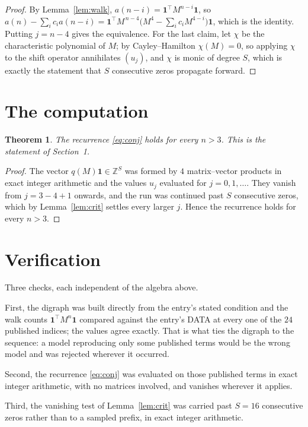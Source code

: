 \documentclass[11pt,a4paper]{article}
\theoremstyle{plain}
\newtheorem{theorem}{Theorem}
\theoremstyle{definition}
\begin{document}
\begin{proof}
By Lemma~\ref{lem:walk}, $a(n-i)=\mathbf{1}^{\!\top}M^{n-i}\mathbf{1}$, so
$a(n)-\sum_i c_i a(n-i)
=\mathbf{1}^{\!\top}M^{\,n-4}\bigl(M^{4}-\sum_i c_i M^{4-i}\bigr)
\mathbf{1}$, which is the identity. Putting $j=n-4$ gives the equivalence. For the
last claim, let $\chi$ be the characteristic polynomial of $M$; by Cayley--Hamilton
$\chi(M)=0$, so applying $\chi$ to the shift operator annihilates $(u_j)$, and $\chi$ is
monic of degree $S$, which is exactly the statement that $S$ consecutive zeros propagate
forward.
\end{proof}

\section{The computation}

\begin{theorem}
The recurrence \eqref{eq:conj} holds for every $n>3$. This is the statement of
Section~1.
\end{theorem}

\begin{proof}
The vector $q(M)\mathbf{1}\in\mathbb{Z}^{S}$ was formed by $4$ matrix--vector
products in exact integer arithmetic and the values $u_j$ evaluated for
$j=0,1,\dots$. They vanish from $j=3-4+1$ onwards, and the run was continued past
$S$ consecutive zeros, which by Lemma~\ref{lem:crit} settles every larger $j$. Hence the
recurrence holds for every $n>3$.
\end{proof}

\section{Verification}

Three checks, each independent of the algebra above.

First, the digraph was built directly from the entry's stated condition and the walk counts
$\mathbf{1}^{\!\top}M^{n}\mathbf{1}$ compared against the entry's DATA at every one of
the $24$ published indices; the values agree exactly. That is what ties the digraph to
the sequence: a model reproducing only some published terms would be the wrong model and
was rejected wherever it occurred.

Second, the recurrence \eqref{eq:conj} was evaluated on those published terms in exact
integer arithmetic, with no matrices involved, and vanishes wherever it applies.

Third, the vanishing test of Lemma~\ref{lem:crit} was carried past $S=16$ consecutive
zeros rather than to a sampled prefix, in exact integer arithmetic.
\end{document}
